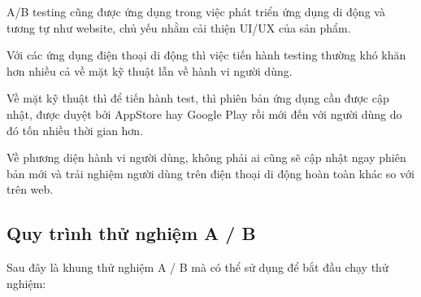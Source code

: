 A/B testing cũng được ứng dụng trong việc phát triển ứng dụng di động và tương tự như website, chủ yếu nhằm cải thiện UI/UX của sản phẩm.

Với các ứng dụng điện thoại di động thì việc tiến hành testing thường khó khăn hơn nhiều cả về mặt kỹ thuật lẫn về hành vi người dùng.

Về mặt kỹ thuật thì để tiến hành test, thì phiên bản ứng dụng cần được cập nhật, được duyệt bởi AppStore hay Google Play rồi mới đến với người dùng do đó tốn nhiều thời gian hơn.

Về phương diện hành vi người dùng, không phải ai cũng sẽ cập nhật ngay phiên bản mới và trải nghiệm người dùng trên điện thoại di động hoàn toàn khác so với trên web.

\subsection{Quy trình thử nghiệm A / B}

Sau đây là khung thử nghiệm A / B mà có thể sử dụng để bắt đầu chạy thử nghiệm:

